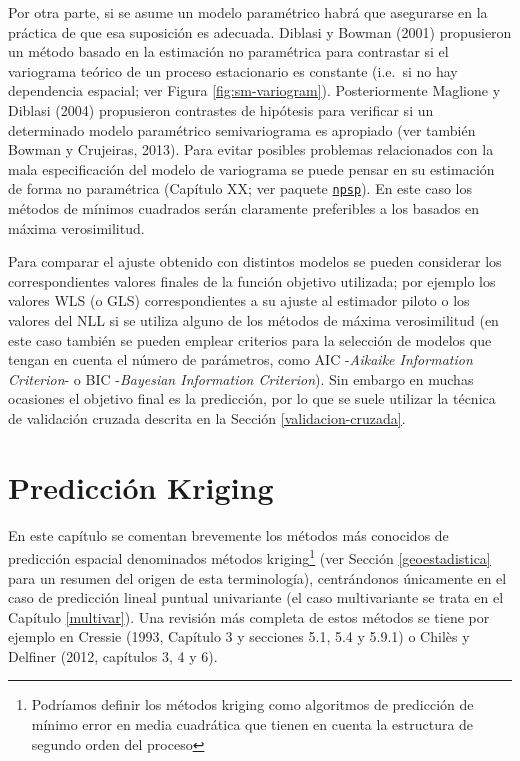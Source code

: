 \documentclass[
]{book}
\theoremstyle{break}
\theoremstyle{definition}
\theoremstyle{definition}
\theoremstyle{definition}
\theoremstyle{definition}
\theoremstyle{remark}
\begin{document}
Por otra parte, si se asume un modelo paramétrico habrá que asegurarse en la práctica de que esa suposición es adecuada.
Diblasi y Bowman (2001) propusieron un método basado en la estimación no paramétrica para contrastar si el variograma teórico de un proceso estacionario es constante (i.e.~si no hay dependencia espacial; ver Figura \ref{fig:sm-variogram}).
Posteriormente Maglione y Diblasi (2004) propusieron contrastes de hipótesis para verificar si un determinado modelo paramétrico semivariograma es apropiado (ver también Bowman y Crujeiras, 2013).
Para evitar posibles problemas relacionados con la mala especificación del modelo de variograma se puede pensar en su estimación de forma no paramétrica
(Capítulo XX; ver paquete \href{https://rubenfcasal.github.io/post/geoestadistica-no-parametrica-con-el-paquete-npsp}{\texttt{npsp}}).
En este caso los métodos de mínimos cuadrados serán claramente preferibles a los basados en máxima verosimilitud.

Para comparar el ajuste obtenido con distintos modelos se pueden considerar los correspondientes valores finales de la función objetivo utilizada; por ejemplo los valores WLS (o GLS) correspondientes a su ajuste al estimador piloto o los valores del NLL si se utiliza alguno de los métodos de máxima verosimilitud (en este caso también se pueden emplear criterios para la selección de modelos que tengan en cuenta el número de parámetros, como AIC -\emph{Aikaike Information Criterion}- o BIC -\emph{Bayesian Information Criterion}).
Sin embargo en muchas ocasiones el objetivo final es la predicción, por lo que se suele utilizar la técnica de validación cruzada descrita en la Sección \ref{validacion-cruzada}.

\chapter{Predicción Kriging}\label{kriging}

En este capítulo se comentan brevemente los métodos más conocidos de predicción espacial denominados métodos kriging\footnote{Podríamos definir los métodos kriging como algoritmos de predicción de mínimo error en media cuadrática que tienen en cuenta la estructura de segundo orden del proceso} (ver Sección \ref{geoestadistica} para un resumen del origen de esta terminología), centrándonos únicamente en el caso de predicción lineal puntual univariante (el caso multivariante se trata en el Capítulo \ref{multivar}).
Una revisión más completa de estos métodos se tiene por ejemplo en Cressie (1993, Capítulo 3 y secciones 5.1, 5.4 y 5.9.1) o Chilès y Delfiner (2012, capítulos 3, 4 y 6).
\end{document}
